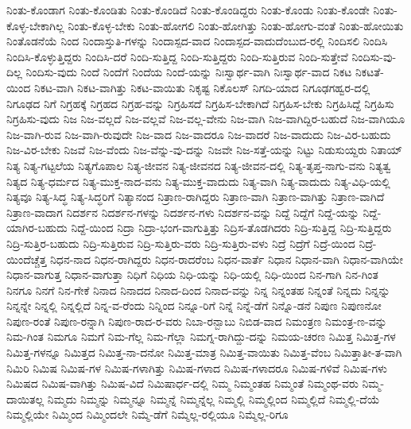 {ನಿಂತು-ಕೊಂಡಾಗ
ನಿಂತು-ಕೊಂಡಿತು
ನಿಂತು-ಕೊಂಡಿದೆ
ನಿಂತು-ಕೊಂಡಿದ್ದರು
ನಿಂತು-ಕೊಂಡು
ನಿಂತು-ಕೊಂಡೇ
ನಿಂತು-ಕೊಳ್ಳ-ಬೇಕಾಗಿಲ್ಲ
ನಿಂತು-ಕೊಳ್ಳ-ಬೇಕು
ನಿಂತು-ಹೋಗಲಿ
ನಿಂತು-ಹೋಗಿತ್ತು
ನಿಂತು-ಹೋಗು-ವಂತೆ
ನಿಂತು-ಹೋಯಿತು
ನಿಂತೊಡನೆಯೆ
ನಿಂದ
ನಿಂದಾಸ್ತುತಿ-ಗಳನ್ನು
ನಿಂದಾಸ್ಪದ-ವಾದ
ನಿಂದಾಸ್ಪದ-ವಾದುದೆಂಬುದ-ರಲ್ಲಿ
ನಿಂದಿಸಲಿ
ನಿಂದಿಸಿ
ನಿಂದಿಸಿ-ಕೊಳ್ಳುತ್ತಿದ್ದರು
ನಿಂದಿಸಿ-ದರೆ
ನಿಂದಿ-ಸುತ್ತಿದ್ದ
ನಿಂದಿ-ಸುತ್ತಿದ್ದರು
ನಿಂದಿ-ಸುತ್ತಿರುವ
ನಿಂದಿ-ಸುತ್ತೇವೆ
ನಿಂದಿಸು-ವು-ದಿಲ್ಲ
ನಿಂದಿಸು-ವುದು
ನಿಂದೆ
ನಿಂದೆಗೆ
ನಿಂದೆಯ
ನಿಂದೆ-ಯನ್ನು
ನಿಃಸ್ವಾರ್ಥ-ವಾಗಿ
ನಿಃಸ್ವಾರ್ಥ-ವಾದ
ನಿಕಟ
ನಿಕಟತೆ-ಯಿಂದ
ನಿಕಟ-ವಾಗಿ
ನಿಕಟ-ವಾಗಿತ್ತು
ನಿಕಟ-ವಾಯಿತು
ನಿಕೃಷ್ಟ
ನಿಕೊಲಸ್
ನಿಗದಿ-ಯಾದ
ನಿಗೂಢಗಹ್ವರ-ದಲ್ಲಿ
ನಿಗೂಢದ
ನಿಗೆ
ನಿಗ್ರಹಕ್ಕೆ
ನಿಗ್ರಹದ
ನಿಗ್ರಹ-ವನ್ನು
ನಿಗ್ರಹಿಸದೆ
ನಿಗ್ರಹಿಸ-ಬೇಕಾಗಿದೆ
ನಿಗ್ರಹಿಸ-ಬೇಕು
ನಿಗ್ರಹಿಸಿದ್ದೆ
ನಿಗ್ರಹಿಸು
ನಿಗ್ರಹಿಸು-ವುದು
ನಿಜ
ನಿಜ-ವಲ್ಲದೆ
ನಿಜ-ವಲ್ಲವೆ
ನಿಜ-ವಲ್ಲ-ವೇನು
ನಿಜ-ವಾಗಿ
ನಿಜ-ವಾಗಿದ್ದಿರ-ಬಹುದೆ
ನಿಜ-ವಾಗಿಯೂ
ನಿಜ-ವಾಗಿ-ರುವ
ನಿಜ-ವಾಗಿ-ರುವುದೇ
ನಿಜ-ವಾದ
ನಿಜ-ವಾದರೂ
ನಿಜ-ವಾದರೆ
ನಿಜ-ವಾದುದು
ನಿಜ-ವಿರ-ಬಹುದು
ನಿಜ-ವಿರ-ಬೇಕು
ನಿಜವೆ
ನಿಜ-ವೆಂದು
ನಿಜ-ವೆನ್ನು-ವು-ದನ್ನು
ನಿಜವೇ
ನಿಜ-ಸತ್ತೆ-ಯನ್ನು
ನಿಟ್ಟು
ನಿಡುಸುಯ್ದರು
ನಿತಾಯ್
ನಿತ್ಯ
ನಿತ್ಯ-ಗಟ್ಟಲೆಯ
ನಿತ್ಯಗೊಪಾಲ
ನಿತ್ಯ-ಜೀವನ
ನಿತ್ಯ-ಜೀವನದ
ನಿತ್ಯ-ಜೀವನ-ದಲ್ಲಿ
ನಿತ್ಯ-ತೃಪ್ತ-ನಾಗು-ವನು
ನಿತ್ಯತ್ವ
ನಿತ್ಯದ
ನಿತ್ಯ-ಧರ್ಮದ
ನಿತ್ಯ-ಮುಕ್ತ-ನಾದ-ವನು
ನಿತ್ಯ-ಮುಕ್ತ-ವಾದುದು
ನಿತ್ಯ-ವಾಗಿ
ನಿತ್ಯ-ವಾದುದು
ನಿತ್ಯ-ವಿಧಿ-ಯಲ್ಲಿ
ನಿತ್ಯವೂ
ನಿತ್ಯ-ಸಿದ್ಧ
ನಿತ್ಯ-ಸಿದ್ಧರಿಗೆ
ನಿತ್ಯಾನಂದ
ನಿತ್ರಾಣ-ರಾಗಿದ್ದರು
ನಿತ್ರಾಣ-ವಾಗಿ
ನಿತ್ರಾಣ-ವಾಗಿತ್ತು
ನಿತ್ರಾಣ-ವಾಗಿದೆ
ನಿತ್ರಾಣ-ವಾದಾಗ
ನಿದರ್ಶನ
ನಿದರ್ಶನ-ಗಳನ್ನು
ನಿದರ್ಶನ-ಗಳು
ನಿದರ್ಶನ-ವನ್ನು
ನಿದ್ದೆ
ನಿದ್ದೆಗೆ
ನಿದ್ದೆ-ಯನ್ನು
ನಿದ್ದೆ-ಯಾಗಿರ-ಬಹುದು
ನಿದ್ದೆ-ಯಿಂದ
ನಿದ್ರಾ
ನಿದ್ರಾ-ಭಂಗ-ವಾಗುತ್ತಿತ್ತು
ನಿದ್ರಿಸ-ತೊಡಗಿದರು
ನಿದ್ರಿ-ಸುತ್ತಿದ್ದ
ನಿದ್ರಿ-ಸುತ್ತಿದ್ದರು
ನಿದ್ರಿ-ಸುತ್ತಿರ-ಬಹುದು
ನಿದ್ರಿ-ಸುತ್ತಿರುವ
ನಿದ್ರಿ-ಸುತ್ತಿರು-ವರು
ನಿದ್ರಿ-ಸುತ್ತಿರು-ವಳು
ನಿದ್ರೆ
ನಿದ್ರೆಗೆ
ನಿದ್ರೆ-ಯಿಂದ
ನಿದ್ರೆ-ಯಿಂದೆಚ್ಚೆತ್ತ
ನಿಧನ-ನಾದ
ನಿಧನ-ರಾಗಿದ್ದರು
ನಿಧನ-ರಾದರೆಂಬ
ನಿಧನ-ವಾರ್ತೆ
ನಿಧಾನ
ನಿಧಾನ-ವಾಗಿ
ನಿಧಾನ-ವಾಗಿಯೇ
ನಿಧಾನ-ವಾಗುತ್ತ
ನಿಧಾನ-ವಾಗುತ್ತಾ
ನಿಧಿಗೆ
ನಿಧಿಯ
ನಿಧಿ-ಯನ್ನು
ನಿಧಿ-ಯಲ್ಲಿ
ನಿಧಿ-ಯಿಂದ
ನಿನ-ಗಾಗಿ
ನಿನ-ಗಿಂತ
ನಿನಗೂ
ನಿನಗೆ
ನಿನ-ಗೇಕೆ
ನಿನಾದ
ನಿನಾದದ
ನಿನಾದ-ದಿಂದ
ನಿನಾದ-ವನ್ನು
ನಿನ್ನ
ನಿನ್ನಂತಹ
ನಿನ್ನಂತೆ
ನಿನ್ನದು
ನಿನ್ನನ್ನು
ನಿನ್ನನ್ನೇ
ನಿನ್ನಲ್ಲಿ
ನಿನ್ನಲ್ಲಿದೆ
ನಿನ್ನ-ವ-ರೆಂದು
ನಿನ್ನಿಂದ
ನಿನ್ನೂ-ರಿಗೆ
ನಿನ್ನೆ
ನಿನ್ನೆ-ಡೆಗೆ
ನಿನ್ನೊ-ಡನೆ
ನಿಪುಣ
ನಿಪುಣನೋ
ನಿಪುಣ-ರಂತೆ
ನಿಪುಣ-ರನ್ನಾಗಿ
ನಿಪುಣ-ರಾದ-ರ-ವರು
ನಿಬಾ-ರನ್ಬಾಬು
ನಿಬಿಡ-ವಾದ
ನಿಮಂತ್ರಣ
ನಿಮಂತ್ರ-ಣ-ವನ್ನು
ನಿಮ-ಗಿಂತ
ನಿಮಗೂ
ನಿಮಗೆ
ನಿಮ-ಗೆಲ್ಲ
ನಿಮ-ಗೆಲ್ಲಾ
ನಿಮಗ್ನ-ರಾಗಿದ್ದು-ದನ್ನು
ನಿಮಯ-ಚರಣ
ನಿಮಿತ್ತ
ನಿಮಿತ್ತ-ಗಳ
ನಿಮಿತ್ತ-ಗಳನ್ನೂ
ನಿಮಿತ್ತದ
ನಿಮಿತ್ತ-ನಾ-ದನೋ
ನಿಮಿತ್ತ-ಮಾತ್ರ
ನಿಮಿತ್ತ-ವಾಯಿತು
ನಿಮಿತ್ತ-ವೆಂಬ
ನಿಮಿತ್ತಾತೀ-ತ-ವಾಗಿ
ನಿಮಿರಿ
ನಿಮಿಷ
ನಿಮಿಷ-ಗಳ
ನಿಮಿಷ-ಗಳಾಗಿತ್ತು
ನಿಮಿಷ-ಗಳಾದ
ನಿಮಿಷ-ಗಳಾದರೂ
ನಿಮಿಷ-ಗಳಿವೆ
ನಿಮಿಷ-ಗಳು
ನಿಮಿಷದ
ನಿಮಿಷ-ವಾಗಿತ್ತು
ನಿಮಿಷ-ವಿದೆ
ನಿಮಿಷಾರ್ಧ-ದಲ್ಲಿ
ನಿಮ್ಮ
ನಿಮ್ಮಂತಹ
ನಿಮ್ಮಂತೆ
ನಿಮ್ಮಂಥ-ವರು
ನಿಮ್ಮ-ದಾಯಿತಲ್ಲ
ನಿಮ್ಮದು
ನಿಮ್ಮನ್ನು
ನಿಮ್ಮನ್ನೂ
ನಿಮ್ಮನ್ನೆ
ನಿಮ್ಮನ್ನೆಲ್ಲ
ನಿಮ್ಮಲ್ಲಿ
ನಿಮ್ಮಲ್ಲಿಂದ
ನಿಮ್ಮಲ್ಲಿದೆ
ನಿಮ್ಮಲ್ಲಿ-ದೆಯೆ
ನಿಮ್ಮಲ್ಲಿಯೇ
ನಿಮ್ಮಿಂದ
ನಿಮ್ಮಿಂದಲೇ
ನಿಮ್ಮೆ-ಡೆಗೆ
ನಿಮ್ಮೆಲ್ಲ-ರಲ್ಲಿಯೂ
ನಿಮ್ಮೆಲ್ಲ-ರಿಗೂ
}
